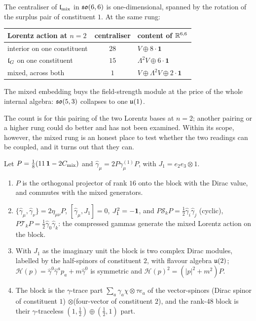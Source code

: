 \begin{proposition}
\label{prop:mixedcost}
The centraliser of $\mathfrak l_{\rm mix}$ in $\mathfrak{so}(6,6)$ is one-dimensional, spanned by the rotation of the surplus pair of
constituent $1$. At the same rung:
\begin{center}
\begin{tabular}{@{}lcl@{}}
\toprule
Lorentz action at $n=2$ & centraliser & content of $\mathbb{R}^{6,6}$\\
\midrule
interior on one constituent & $28$ & $V\oplus8\cdot\mathbf1$\\
$\mathfrak l_G$ on one constituent & $15$ & $\Lambda^2V\oplus6\cdot\mathbf1$\\
mixed, across both & $1$ & $V\oplus\Lambda^2V\oplus2\cdot\mathbf1$\\
\bottomrule
\end{tabular}
\end{center}
The mixed embedding buys the field-strength module at the price of the whole internal algebra: $\mathfrak{so}(5,3)$ collapses to one $\mathfrak{u}(1)$.
\end{proposition}

The count is for this pairing of the two Lorentz bases at $n=2$; another pairing or a higher rung could do better and has not been
examined. Within its scope, however, the mixed rung is an honest place to test whether the two readings can be coupled, and it turns out
that they can.

\begin{theorem}
\label{thm:mixeddirac}
Let $P=\tfrac18(11\,\mathbf 1-2C_{\rm mix})$ and $\hat\gamma_\mu=2P\gamma^{(1)}_\mu P$, with $J_1=e_2e_3\otimes1$.
\begin{enumerate}[label=(\roman*),leftmargin=2.2em]
\item $P$ is the orthogonal projector of rank $16$ onto the block with the Dirac value, and commutes with the mixed generators.
\item $\{\hat\gamma_\mu,\hat\gamma_\nu\}=2\eta_{\mu\nu}P$, $[\hat\gamma_\mu,J_1]=0$, $J_1^2=-\mathbf 1$, and $P\mathcal S_kP=\tfrac12\hat\gamma_i\hat\gamma_j$ (cyclic),
$P\mathcal T_kP=\tfrac12\hat\gamma_0\hat\gamma_k$: the compressed gammas generate the mixed Lorentz action on the block.
\item With $J_1$ as the imaginary unit the block is two complex Dirac modules, labelled by the half-spinors of constituent $2$, with
flavour algebra $\mathfrak{u}(2)$; $\mathcal H(p)=\hat\gamma^0\hat\gamma^ap_a+m\hat\gamma^0$ is symmetric and $\mathcal H(p)^2=(|p|^2+m^2)P$.
\item The block is the $\gamma$-trace part $\sum_a\gamma_a\chi\otimes\tau e_a$ of the vector-spinors (Dirac spinor of constituent $1$)
$\otimes$(four-vector of constituent $2$), and the rank-$48$ block is their $\gamma$-traceless $(1,\tfrac12)\oplus(\tfrac12,1)$ part.
\end{enumerate}
\end{theorem}

